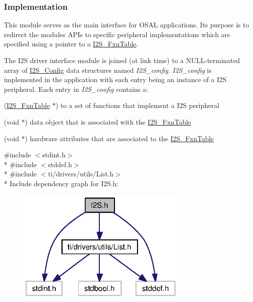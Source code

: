 \subsubsection*{Implementation}

This module serves as the main interface for O\+S\+A\+L applications. Its purpose is to redirect the module\textquotesingle{}s A\+P\+Is to specific peripheral implementations which are specified using a pointer to a \hyperlink{struct_i2_s___fxn_table}{I2\+S\+\_\+\+Fxn\+Table}.

The I2\+S driver interface module is joined (at link time) to a N\+U\+L\+L-\/terminated array of \hyperlink{struct_i2_s___config}{I2\+S\+\_\+\+Config} data structures named {\itshape I2\+S\+\_\+config}. {\itshape I2\+S\+\_\+config} is implemented in the application with each entry being an instance of a I2\+S peripheral. Each entry in {\itshape I2\+S\+\_\+config} contains a\+:
\begin{DoxyItemize}
\item (\hyperlink{struct_i2_s___fxn_table}{I2\+S\+\_\+\+Fxn\+Table} $\ast$) to a set of functions that implement a I2\+S peripheral
\item (void $\ast$) data object that is associated with the \hyperlink{struct_i2_s___fxn_table}{I2\+S\+\_\+\+Fxn\+Table}
\item (void $\ast$) hardware attributes that are associated to the \hyperlink{struct_i2_s___fxn_table}{I2\+S\+\_\+\+Fxn\+Table} 


\end{DoxyItemize}{\ttfamily \#include $<$stdint.\+h$>$}\\*
{\ttfamily \#include $<$stddef.\+h$>$}\\*
{\ttfamily \#include $<$ti/drivers/utils/\+List.\+h$>$}\\*
Include dependency graph for I2\+S.\+h\+:
\nopagebreak
\begin{figure}[H]
\begin{center}
\leavevmode
\includegraphics[width=236pt]{_i2_s_8h__incl}
\end{center}
\end{figure}
